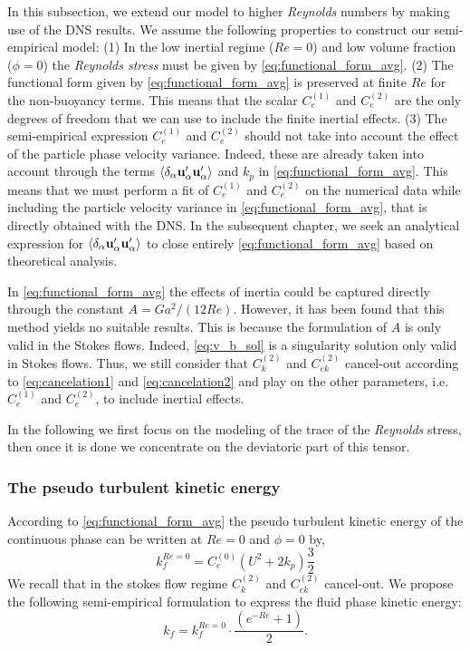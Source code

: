 In this subsection, we extend our model to higher \textit{Reynolds} numbers by making use of the DNS results. 
We assume the following properties to construct our semi-empirical model: 
(1) In the low inertial regime ($Re=0$) and low volume fraction ($\phi=0$) the \textit{Reynolds stress} must be given by  \ref{eq:functional_form_avg}. 
(2) The functional form given by \ref{eq:functional_form_avg} is preserved at finite $Re$ for the non-buoyancy terms. 
This means that the scalar $C_e^{(1)}$ and $C_e^{(2)}$ are the only degrees of freedom that we can use to include the finite inertial effects. 
(3) The semi-empirical expression  $C_e^{(1)}$ and $C_e^{(2)}$ should not take into account the effect of the particle phase velocity variance. 
Indeed, these are already taken into account through the terms $\left<\delta_\alpha \textbf{u}_\alpha'\textbf{u}_\alpha'\right>$ and $k_p$ in \ref{eq:functional_form_avg}. 
This means that we must perform a fit of $C_e^{(1)}$ and $C_e^{(2)}$ on the numerical data while including the particle velocity variance in \ref{eq:functional_form_avg}, that is directly obtained with the DNS.
In the subsequent chapter, we seek an analytical expression for $\left<\delta_\alpha \textbf{u}_\alpha'\textbf{u}_\alpha'\right>$ to close entirely \ref{eq:functional_form_avg} based on theoretical analysis.

In \ref{eq:functional_form_avg} the effects of inertia could be captured directly through the constant $A = Ga^2 /(12 Re)$. 
However, it has been found that this method yields no suitable results. 
This is because the formulation of $A$ is only valid in the Stokes flows. 
Indeed, \ref{eq:v_b_sol} is a singularity solution only valid in Stokes flows. 
Thus, we still consider that $C_k^{(2)}$ and $C_{ek}^{(2)}$ cancel-out according to \ref{eq:cancelation1} and \ref{eq:cancelation2} and play on the other parameters, i.e. $C_e^{(1)}$ and $C_e^{(2)}$,  to include inertial effects. 

In the following we first focus on the modeling of the trace of the \textit{Reynolds} stress, then once it is done we concentrate on the deviatoric part of this tensor. 

\subsubsection{The pseudo turbulent kinetic energy}

According to \ref{eq:functional_form_avg} the pseudo turbulent kinetic energy of the continuous phase can be written at $Re = 0$ and $\phi = 0$ by,
\begin{equation}
    k_f^{Re = 0}
    = 
    C_e^{(0)}  \left( U^2 + 2 k_p\right)  \frac{3}{2}
    \label{eq:TKE}
\end{equation}
We recall that in the stokes flow regime $C_k^{(2)}$ and $C_{ek}^{(2)}$ cancel-out. 
We propose the following semi-empirical formulation to express the fluid phase kinetic energy: 
\begin{equation}
    k_f
    = 
    k_f^{Re = 0}
    \cdot \frac{\left(e^{-Re} +1\right)}{2}.
    \label{eq:semi_empirical}
\end{equation}


